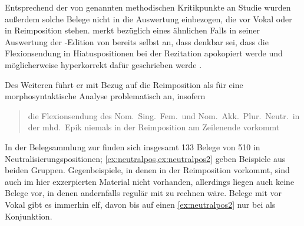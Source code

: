 \label{phsec:kchiatus}
Entsprechend der von \citet{gjelsten1980} genannten methodischen Kritikpunkte
an  Studie wurden außerdem solche Belege nicht in die
Auswertung einbezogen, die vor Vokal oder in Reimposition stehen.
\citet{askedal1973} merkt bezüglich eines ähnlichen Falls in seiner Auswertung
der -Edition von \citet{maroldschroeder1969}
bereits selbst an, dass denkbar sei, dass die Flexionsendung  in
Hiatuspositionen bei der Rezitation apokopiert werde und möglicherweise
hyperkorrekt dafür  geschrieben werde \autocite[90--91]{askedal1973}.

Des Weiteren führt er mit Bezug auf \citet[662--663]{grimm1870} die
Reimposition als für eine morphosyntaktische Analyse problematisch an, insofern
\blockcquote[89]{askedal1973}{die Flexionsendung  des Nom.\ Sing.\
Fem.\ und Nom.\ Akk.\ Plur.\ Neutr.\ in der mhd.\ Epik niemals in der
Reimposition am Zeilenende vorkommt}. In der Belegsammlung zur \KC{}
finden sich insgesamt 133 Belege von 510 in Neutralisierungspositionen;
\cref{ex:neutralpos,ex:neutralpos2} geben Beispiele aus beiden Gruppen.
Gegenbeispiele, in denen \norm{bėidiu} in der Reimposition vorkommt, sind auch
im hier exzerpierten Material nicht vorhanden, allerdings liegen auch keine
Belege vor, in denen andernfalls regulär mit \norm{-iu} zu rechnen wäre. Belege
mit \norm{iu} vor Vokal gibt es immerhin elf, davon bis auf einen
\cref{ex:neutralpos2} nur bei \norm{bėide} als Konjunktion.


